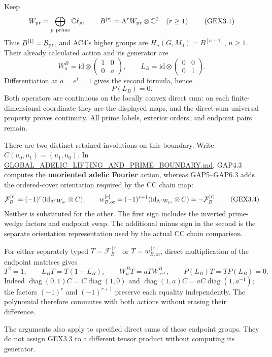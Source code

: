 Keep \[
W_{\rm pr}=\bigoplus_{p\ {\rm prime}}\mathbb C\ell_p,\qquad
B^{[r]}=\Lambda^rW_{\rm pr}\otimes\mathbb C^2\quad(r\ge1).
\tag{GEX3.1}
\] Thus \(B^{[1]}=\mathcal B_{\rm pr}\), and AC4's higher groups are
\(H_n(G,M_0)=B^{[n+1]}\), \(n\ge1\). Their already calculated action and
its generator are \[
W_a^B=\mathrm{id}\otimes\begin{pmatrix}1&0\\0&a\end{pmatrix},
\qquad
L_B=\mathrm{id}\otimes\begin{pmatrix}0&0\\0&1\end{pmatrix}.
\tag{GEX3.2}
\] Differentiation at \(a=e^t=1\) gives the second formula, hence \[
P(L_B)=0.
\tag{GEX3.3}
\] Both operators are continuous on the locally convex direct sum: on
each finite-dimensional coordinate they are the displayed maps, and the
direct-sum universal property proves continuity. All prime labels,
exterior orders, and endpoint pairs remain.

There are two distinct retained involutions on this boundary. Write
\(C(u_0,u_1)=(u_1,u_0)\). In
\url{GLOBAL_ADELIC_LIFTING_AND_PRIME_BOUNDARY.md}, GAP4.3 computes the
\textbf{unoriented adelic Fourier} action, whereas GAP5--GAP6.3 adds the
ordered-cover orientation required by the CC chain map: \[
\mathcal F_B^{[r]}=(-1)^r(\mathrm{id}_{\Lambda^rW_{\rm pr}}\otimes C),
\qquad
w_{B,\mathrm{or}}^{[r]}=(-1)^{r+1}(\mathrm{id}_{\Lambda^rW_{\rm pr}}\otimes C)
=-\mathcal F_B^{[r]}.
\tag{GEX3.4}
\] Neither is substituted for the other. The first sign includes the
inverted prime-wedge factors and endpoint swap. The additional minus
sign in the second is the separate orientation representation used by
the actual CC chain comparison.

For either separately typed \(T=\mathcal F_B^{[r]}\) or
\(T=w_{B,\mathrm{or}}^{[r]}\), direct multiplication of the endpoint
matrices gives \[
 T^2=1,\qquad L_BT=T(1-L_B),\qquad
 W_a^BT=aT W_{a^{-1}}^B,\qquad P(L_B)T=TP(L_B)=0.
\tag{GEX3.5}
\] Indeed \(\operatorname{diag}(0,1)C=C\operatorname{diag}(1,0)\) and
\(\operatorname{diag}(1,a)C=aC\operatorname{diag}(1,a^{-1})\); the
factors \((-1)^r\) and \((-1)^{r+1}\) preserve each equality
independently. The polynomial therefore commutes with both actions
without erasing their difference.

The arguments also apply to specified direct sums of these endpoint
groups. They do not assign GEX3.3 to a different tensor product without
computing its generator.

